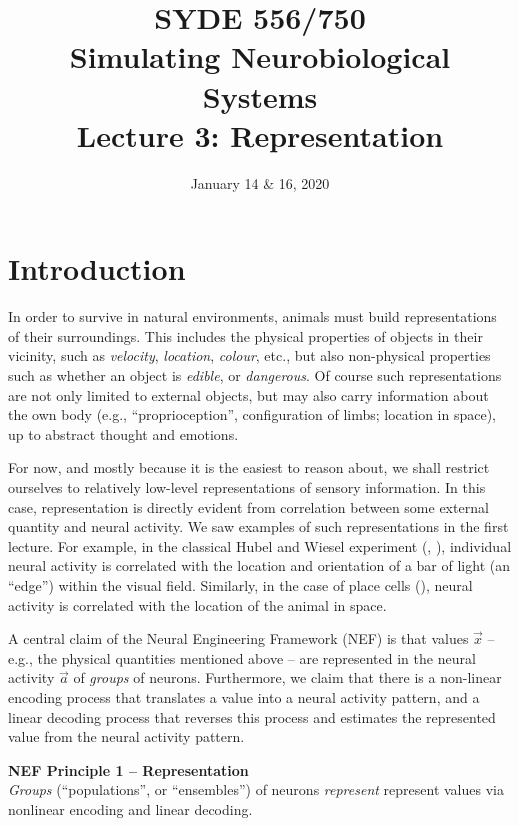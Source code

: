 \documentclass[10pt,letterpaper,oneside]{article}
\date{January 14 \& 16, 2020}
\title{SYDE 556/750 \\ Simulating Neurobiological Systems \\ Lecture 3: Representation}
\begin{document}

\section{Introduction}


In order to survive in natural environments, animals must build representations of their surroundings. This includes the physical properties of objects in their vicinity, such as \emph{velocity}, \emph{location}, \emph{colour}, etc., but also non-physical properties such as whether an object is \emph{edible}, or \emph{dangerous}. Of course such representations are not only limited to external objects, but may also carry information about the own body (e.g., \enquote{proprioception}, configuration of limbs; location in space), up to abstract thought and emotions.

For now, and mostly because it is the easiest to reason about, we shall restrict ourselves to relatively low-level representations of sensory information. In this case, representation is directly evident from correlation between some external quantity and neural activity.  We saw examples of such representations in the first lecture. For example, in the classical Hubel and Wiesel experiment (, \cite{hubel1959receptive}), individual neural activity is correlated with the location and orientation of a bar of light (an \enquote{edge}) within the visual field. Similarly, in the case of place cells (), neural activity is correlated with the location of the animal in space.

A central claim of the Neural Engineering Framework (NEF) is that values $\vec x$ -- e.g., the physical quantities mentioned above -- are represented in the neural activity $\vec a$ of \emph{groups} of neurons. Furthermore, we claim that there is a non-linear encoding process that translates a value into a neural activity pattern, and a linear decoding process that reverses this process and estimates the represented value from the neural activity pattern.

\begin{mdframed}
\textbf{NEF Principle 1 -- Representation}\\
\emph{Groups} (\enquote{populations}, or \enquote{ensembles}) of neurons \emph{represent} represent values via nonlinear encoding and linear decoding.
\end{mdframed}
\end{document}
